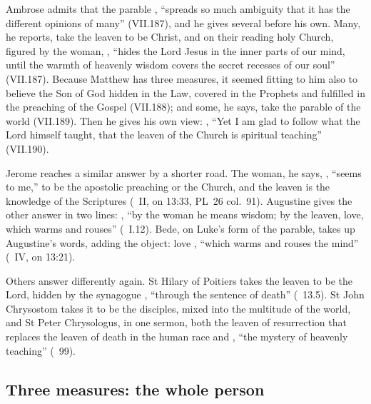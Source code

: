 Ambrose admits that the parable , ``spreads so much ambiguity that it has
the different opinions of many'' (VII.187), and he gives several before his
own. Many, he reports, take the leaven to be Christ, and on their reading holy
Church, figured by the woman, , ``hides the Lord Jesus in the inner parts of our mind,
until the warmth of heavenly wisdom covers the secret recesses of our soul''
(VII.187). Because Matthew has three measures, it seemed fitting to him also
to believe the Son of God hidden in the Law, covered in the Prophets and
fulfilled in the preaching of the Gospel (VII.188); and some, he says, take
the parable of the world (VII.189). Then he gives his own view: , ``Yet I am glad to follow what the Lord himself taught, that the
leaven of the Church is spiritual teaching'' (VII.190).

Jerome reaches a similar answer by a shorter road. The woman, he says,
, ``seems to me,'' to be the apostolic preaching or the
Church, and the leaven is the knowledge of the Scriptures (~II, on 13:33, PL~26 col.~91). Augustine gives the other answer in
two lines: , ``by the woman he means wisdom; by the leaven, love,
which warms and rouses'' (~I.12). Bede, on
Luke's form of the parable, takes up Augustine's words, adding the object:
love , ``which warms and rouses the
mind'' (~IV, on 13:21).

Others answer differently again. St Hilary of Poitiers takes the leaven to be
the Lord, hidden by the synagogue , ``through the
sentence of death'' (~13.5). St John Chrysostom takes it to
be the disciples, mixed into the multitude of the world, and St Peter
Chrysologus, in one sermon, both the leaven of resurrection that replaces the
leaven of death in the human race and , ``the mystery of heavenly teaching'' (~99).

\subsection{Three measures: the whole person}
\label{sec:leaven-measures}

